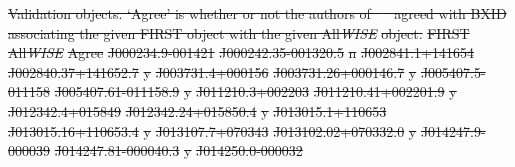 \documentclass[11pt, a4paper]{book}
\providecommand{\DIFdeltex}[1]{{\protect\color{red}\sout{#1}}}                      %
\providecommand{\DIFdelFL}[1]{\DIFdel{#1}} %
\providecommand{\DIFdel}[1]{\texorpdfstring{\DIFdeltex{#1}}{}} %
\begin{document}
{%
\DIFdelFL{Validation objects. `Agree' is whether or not the authors of \mbox{%
\citet{alger21rlfs} }\hspace{0pt}%
agreed with BXID associating the given FIRST object with the given All}\emph{\DIFdelFL{WISE}} %
\DIFdelFL{object.}}
\DIFdelFL{FIRST }%
\DIFdelFL{All}\emph{\DIFdelFL{WISE}} %
\DIFdelFL{Agree}%
\DIFdelFL{J000234.9-001421 }%
\DIFdelFL{J000242.35-001320.5 }%
\DIFdelFL{n}%
\DIFdelFL{J002841.1+141654 }%
\DIFdelFL{J002840.37+141652.7 }%
\DIFdelFL{y}%
\DIFdelFL{J003731.4+000156 }%
\DIFdelFL{J003731.26+000146.7 }%
\DIFdelFL{y}%
\DIFdelFL{J005407.5-011158 }%
\DIFdelFL{J005407.61-011158.9 }%
\DIFdelFL{y}%
\DIFdelFL{J011210.3+002203 }%
\DIFdelFL{J011210.41+002201.9 }%
\DIFdelFL{y}%
\DIFdelFL{J012342.4+015849 }%
\DIFdelFL{J012342.24+015850.4 }%
\DIFdelFL{y}%
\DIFdelFL{J013015.1+110653 }%
\DIFdelFL{J013015.16+110653.4 }%
\DIFdelFL{y}%
\DIFdelFL{J013107.7+070343 }%
\DIFdelFL{J013102.02+070332.0 }%
\DIFdelFL{y}%
\DIFdelFL{J014247.9-000039 }%
\DIFdelFL{J014247.81-000040.3 }%
\DIFdelFL{y}%
\DIFdelFL{J014250.0-000032 }%
\end{document}
